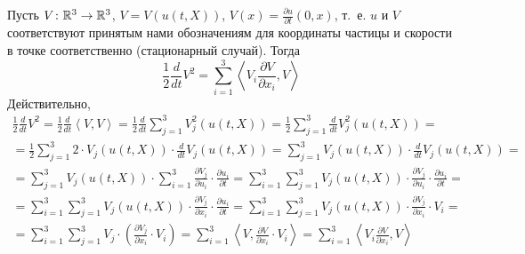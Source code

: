 Пусть $V \colon \mathbb{R}^3 \to \mathbb{R}^3$, $V = V(u(t,X))$, $V(x) = \frac{\partial u}{\partial t}(0,x)$,
т.~е. $u$ и $V$ соответствуют принятым нами обозначениям для координаты частицы и скорости в точке соответственно
(стационарный случай).
Тогда
\begin{equation} \label{d-dt-V-2}
	\frac{1}{2} \frac{d}{dt}V^2 = \sum\limits_{i=1}^{3} \left< V_i \frac{\partial V}{\partial x_i}, V \right>
\end{equation}
Действительно,
\begin{multline*}
	\frac{1}{2} \frac{d}{dt}V^2 =
	\frac{1}{2} \frac{d}{dt}\left< V, V \right> =
	\frac{1}{2} \frac{d}{dt} \sum\limits_{j=1}^{3} V_j^2 (u(t,X)) =
	\frac{1}{2} \sum\limits_{j=1}^{3} \frac{d}{dt} V_j^2 (u(t,X)) =
	\\ =
	\frac{1}{2} \sum\limits_{j=1}^{3} 2 \cdot V_j (u(t,X)) \cdot \frac{d}{dt} V_j(u(t,X)) =
	\sum\limits_{j=1}^{3} V_j (u(t,X)) \cdot \frac{d}{dt} V_j(u(t,X)) =
	\\ =
	\sum\limits_{j=1}^{3} V_j (u(t,X)) \cdot \sum\limits_{i=1}^{3} \frac{\partial V_j}{\partial u_i} \cdot \frac{\partial u_i}{\partial t} =
	\sum\limits_{i=1}^{3} \sum\limits_{j=1}^{3} V_j (u(t,X)) \cdot \frac{\partial V_j}{\partial u_i} \cdot \frac{\partial u_i}{\partial t} =
	\\ =
	\sum\limits_{i=1}^{3} \sum\limits_{j=1}^{3} V_j (u(t,X)) \cdot \frac{\partial V_j}{\partial x_i} \cdot \frac{\partial u_i}{\partial t} =
	\sum\limits_{i=1}^{3} \sum\limits_{j=1}^{3} V_j (u(t,X)) \cdot \frac{\partial V_j}{\partial x_i} \cdot V_i =
	\\ =
	\sum\limits_{i=1}^{3} \sum\limits_{j=1}^{3} V_j \cdot \left( \frac{\partial V_j}{\partial x_i} \cdot V_i \right) =
	\sum\limits_{i=1}^{3} \left< V,  \frac{\partial V}{\partial x_i} \cdot V_i \right> =
	\sum\limits_{i=1}^{3} \left< V_i \frac{\partial V}{\partial x_i}, V \right>
\end{multline*}
